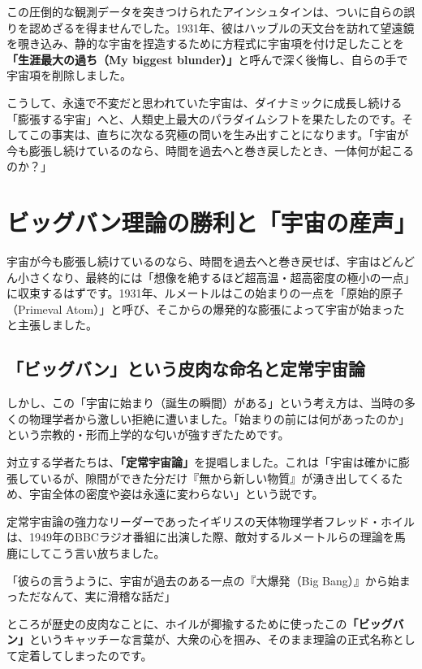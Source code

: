 この圧倒的な観測データを突きつけられたアインシュタインは、ついに自らの誤りを認めざるを得ませんでした。1931年、彼はハッブルの天文台を訪れて望遠鏡を覗き込み、静的な宇宙を捏造するために方程式に宇宙項を付け足したことを\textbf{「生涯最大の過ち（My biggest blunder）」}と呼んで深く後悔し、自らの手で宇宙項を削除しました。

こうして、永遠で不変だと思われていた宇宙は、ダイナミックに成長し続ける「膨張する宇宙」へと、人類史上最大のパラダイムシフトを果たしたのです。そしてこの事実は、直ちに次なる究極の問いを生み出すことになります。「宇宙が今も膨張し続けているのなら、時間を過去へと巻き戻したとき、一体何が起こるのか？」

\section{ビッグバン理論の勝利と「宇宙の産声」}

宇宙が今も膨張し続けているのなら、時間を過去へと巻き戻せば、宇宙はどんどん小さくなり、最終的には「想像を絶するほど超高温・超高密度の極小の一点」に収束するはずです。1931年、ルメートルはこの始まりの一点を「原始的原子（Primeval Atom）」と呼び、そこからの爆発的な膨張によって宇宙が始まったと主張しました。

\subsection{「ビッグバン」という皮肉な命名と定常宇宙論}

しかし、この「宇宙に始まり（誕生の瞬間）がある」という考え方は、当時の多くの物理学者から激しい拒絶に遭いました。「始まりの前には何があったのか」という宗教的・形而上学的な匂いが強すぎたためです。

対立する学者たちは、\textbf{「定常宇宙論」}を提唱しました。これは「宇宙は確かに膨張しているが、隙間ができた分だけ『無から新しい物質』が湧き出してくるため、宇宙全体の密度や姿は永遠に変わらない」という説です。

定常宇宙論の強力なリーダーであったイギリスの天体物理学者フレッド・ホイルは、1949年のBBCラジオ番組に出演した際、敵対するルメートルらの理論を馬鹿にしてこう言い放ちました。

「彼らの言うように、宇宙が過去のある一点の『大爆発（Big Bang）』から始まっただなんて、実に滑稽な話だ」

ところが歴史の皮肉なことに、ホイルが揶揄するために使ったこの\textbf{「ビッグバン」}というキャッチーな言葉が、大衆の心を掴み、そのまま理論の正式名称として定着してしまったのです。

